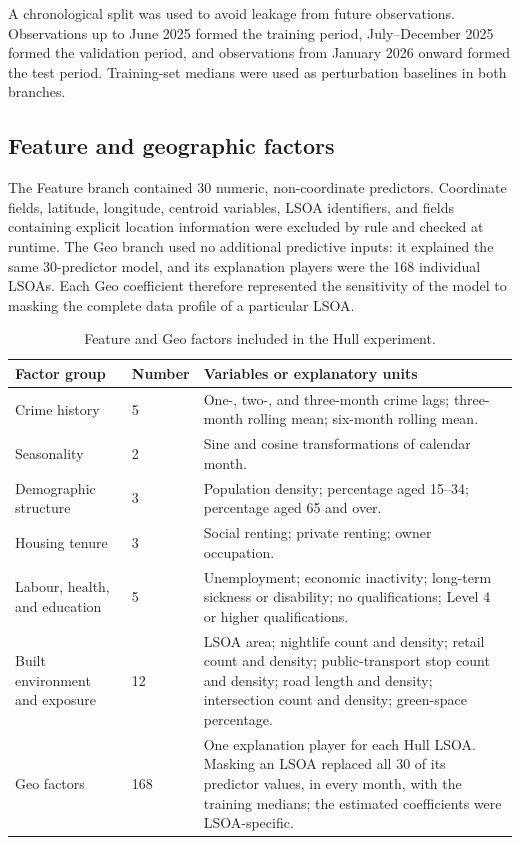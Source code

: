 A chronological split was used to avoid leakage from future observations. Observations up to June 2025 formed the training period, July--December 2025 formed the validation period, and observations from January 2026 onward formed the test period. Training-set medians were used as perturbation baselines in both branches.

\subsection{Feature and geographic factors}
\label{sec:hull_factors}

The Feature branch contained 30 numeric, non-coordinate predictors. Coordinate fields, latitude, longitude, centroid variables, LSOA identifiers, and fields containing explicit location information were excluded by rule and checked at runtime. The Geo branch used no additional predictive inputs: it explained the same 30-predictor model, and its explanation players were the 168 individual LSOAs. Each Geo coefficient therefore represented the sensitivity of the model to masking the complete data profile of a particular LSOA.

\begin{table}[H]
\centering
\caption{Feature and Geo factors included in the Hull experiment.}
\label{tab:hull_factor_groups}
\small
\begin{tabularx}{\textwidth}{p{} p{} X}
\toprule
Factor group & Number & Variables or explanatory units \\
\midrule
Crime history & 5 &
One-, two-, and three-month crime lags; three-month rolling mean; six-month rolling mean. \\
Seasonality & 2 &
Sine and cosine transformations of calendar month. \\
Demographic structure & 3 &
Population density; percentage aged 15--34; percentage aged 65 and over. \\
Housing tenure & 3 &
Social renting; private renting; owner occupation. \\
Labour, health, and education & 5 &
Unemployment; economic inactivity; long-term sickness or disability; no qualifications; Level 4 or higher qualifications. \\
Built environment and exposure & 12 &
LSOA area; nightlife count and density; retail count and density; public-transport stop count and density; road length and density; intersection count and density; green-space percentage. \\
Geo factors & 168 &
One explanation player for each Hull LSOA. Masking an LSOA replaced all 30 of its predictor values, in every month, with the training medians; the estimated coefficients were LSOA-specific. \\
\bottomrule
\end{tabularx}
\end{table}

